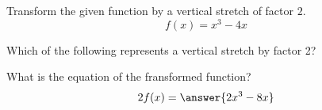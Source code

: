 \documentclass{ximera}
\author{Ivo Terek}
\begin{document}
Transform the given function by a vertical stretch of factor $2$.
\[
f(x)=x^3-4x
\]
\begin{exercise}
Which of the following represents a vertical stretch by factor 2?
\begin{multipleChoice}
\end{multipleChoice}
\end{exercise}
\begin{exercise}
What is the equation of the fransformed function?
\[
2f(x)=\answer{2x^3-8x}
\]

\end{exercise}
\end{document}
